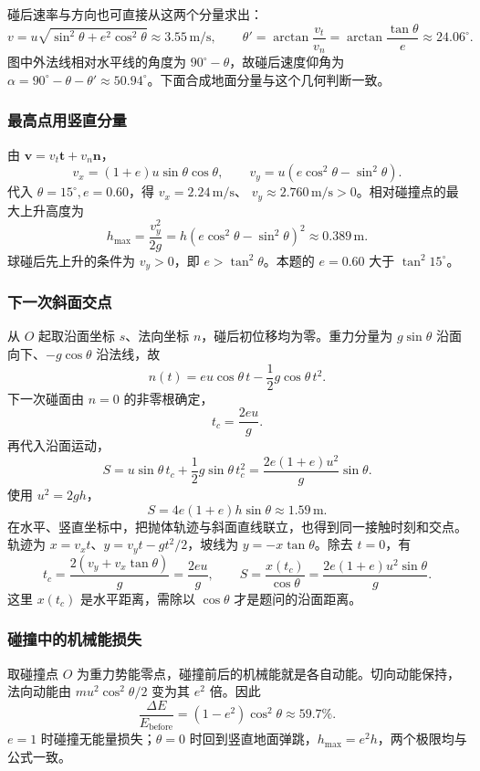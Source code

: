 \documentclass[UTF8,fontset=fandol,a4paper,11pt]{ctexart}
\newcommand{\vect}[1]{\bm{#1}}
\begin{document}
碰后速率与方向也可直接从这两个分量求出：
\[
v=u\sqrt{\sin^2\theta+e^2\cos^2\theta}\approx3.55\,\mathrm{m/s},\qquad
\theta'=\arctan\frac{v_t}{v_n}=\arctan\frac{\tan\theta}{e}\approx24.06^\circ.
\]
图中外法线相对水平线的角度为 $90^\circ-\theta$，故碰后速度仰角为 $\alpha=90^\circ-\theta-\theta'\approx50.94^\circ$。下面合成地面分量与这个几何判断一致。

\subsubsection*{最高点用竖直分量}
由 $\vect v=v_t\vect t+v_n\vect n$，
\[
v_x=(1+e)u\sin\theta\cos\theta,\qquad
v_y=u(e\cos^2\theta-\sin^2\theta).
\]
代入 $\theta=15^\circ,e=0.60$，得 $v_x=2.24\,\mathrm{m/s}$、
$v_y\approx2.760\,\mathrm{m/s}>0$。相对碰撞点的最大上升高度为
\[
\boxed{h_{\max}=\frac{v_y^2}{2g}
=h(e\cos^2\theta-\sin^2\theta)^2
\approx0.389\,\mathrm m}.
\]
球碰后先上升的条件为 $v_y>0$，即 $e>\tan^2\theta$。本题的 $e=0.60$ 大于 $\tan^2 15^\circ$。

\subsubsection*{下一次斜面交点}
从 $O$ 起取沿面坐标 $s$、法向坐标 $n$，碰后初位移均为零。重力分量为 $g\sin\theta$ 沿面向下、$-g\cos\theta$ 沿法线，故
\[
n(t)=eu\cos\theta\,t-\frac12g\cos\theta\,t^2.
\]
下一次碰面由 $n=0$ 的非零根确定，
\[
t_c=\frac{2eu}{g}.
\]
再代入沿面运动，
\[
S=u\sin\theta\,t_c+\frac12g\sin\theta\,t_c^2
=\frac{2e(1+e)u^2}{g}\sin\theta.
\]
使用 $u^2=2gh$，
\[
\boxed{S=4e(1+e)h\sin\theta\approx1.59\,\mathrm m}.
\]
在水平、竖直坐标中，把抛体轨迹与斜面直线联立，也得到同一接触时刻和交点。轨迹为 $x=v_xt$、$y=v_yt-gt^2/2$，坡线为 $y=-x\tan\theta$。除去 $t=0$，有
\[
t_c=\frac{2(v_y+v_x\tan\theta)}g
=\frac{2eu}g,\qquad
S=\frac{x(t_c)}{\cos\theta}
=\frac{2e(1+e)u^2\sin\theta}g.
\]
这里 $x(t_c)$ 是水平距离，需除以 $\cos\theta$ 才是题问的沿面距离。

\subsubsection*{碰撞中的机械能损失}
取碰撞点 $O$ 为重力势能零点，碰撞前后的机械能就是各自动能。切向动能保持，法向动能由
$mu^2\cos^2\theta/2$ 变为其 $e^2$ 倍。因此
\[
\boxed{\frac{\Delta E}{E_{\mathrm{before}}}
=(1-e^2)\cos^2\theta\approx59.7\%}.
\]
$e=1$ 时碰撞无能量损失；$\theta=0$ 时回到竖直地面弹跳，$h_{\max}=e^2h$，两个极限均与公式一致。
\end{document}
